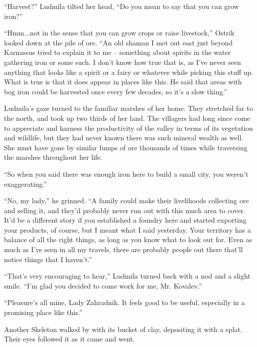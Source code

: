 “Harvest?” Ludmila tilted her head, “Do you mean to say that you can grow iron?”

 

“Hmm...not in the sense that you can grow crops or raise livestock,” Ostrik looked down at the pile of ore. “An old shaman I met out east just beyond Karnassus tried to explain it to me – something about spirits in the water gathering iron or some such. I don’t know how true that is, as I’ve never seen anything that looks like a spirit or a fairy or whatever while picking this stuff up. What is true is that it does appear in places like this. He said that areas with bog iron could be harvested once every few decades, so it’s a slow thing.”

 

Ludmila’s gaze turned to the familiar marshes of her home. They stretched far to the north, and took up two thirds of her land. The villagers had long since come to appreciate and harness the productivity of the valley in terms of its vegetation and wildlife, but they had never known there was such mineral wealth as well. She must have gone by similar lumps of ore thousands of times while traversing the marshes throughout her life.

 

“So when you said there was enough iron here to build a small city, you weren’t exaggerating.”

 

“No, my lady,” he grinned. “A family could make their livelihoods collecting ore and selling it, and they’d probably never run out with this much area to cover. It’d be a different story if you established a foundry here and started exporting your products, of course, but I meant what I said yesterday. Your territory has a balance of all the right things, as long as you know what to look out for. Even as much as I’ve seen in all my travels, there are probably people out there that’ll notice things that I haven’t.”

 

“That’s very encouraging to hear,” Ludmila turned back with a nod and a slight smile. “I’m glad you decided to come work for me, Mr. Kovalev.”

 

“Pleasure’s all mine, Lady Zahradnik. It feels good to be useful, especially in a promising place like this.”

 

Another Skeleton walked by with its bucket of clay, depositing it with a splat. Their eyes followed it as it came and went.

